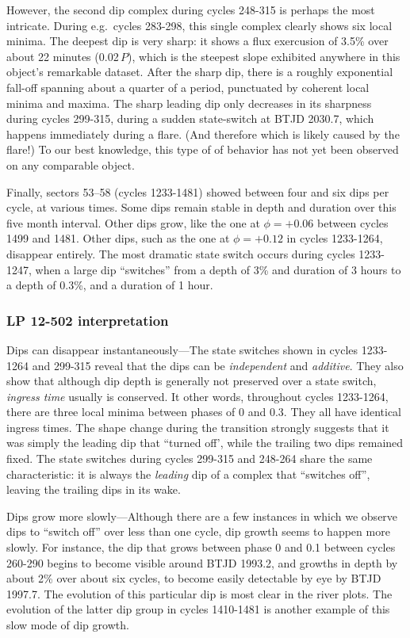 \documentclass[11pt,twocolumn,tighten]{aastex63}
\begin{document}
However, the second dip complex during cycles 248-315 is perhaps the
most intricate.  During e.g.~cycles 283-298, this single complex
clearly shows six local minima.  The deepest dip is very sharp: it
shows a flux exercusion of 3.5\% over about 22 minutes (0.02\,$P$),
which is the steepest slope exhibited anywhere in this object's
remarkable dataset.  After the sharp dip, there is a roughly
exponential fall-off spanning about a quarter of a period, punctuated
by coherent local minima and maxima.  The sharp leading dip only
decreases in its sharpness during cycles 299-315, during a sudden
state-switch at BTJD 2030.7, which happens immediately during a flare.
(And therefore which is likely caused by the flare!) To our best
knowledge, this type of of behavior has not yet been observed on any
comparable object.

Finally, sectors 53--58 (cycles 1233-1481) showed between four and six
dips per cycle, at various times.  Some dips remain stable in depth
and duration over this five month interval.  Other dips grow, like the
one at $\phi = +0.06$ between cycles 1499 and 1481.  Other dips, such
as the one at $\phi = +0.12$ in cycles 1233-1264, disappear entirely.
The most dramatic state switch occurs during cycles 1233-1247, when a
large dip ``switches'' from a depth of 3\% and duration of 3 hours to
a depth of 0.3\%, and a duration of 1 hour.

\subsubsection{LP 12-502 interpretation}

{\sc Dips can disappear instantaneously}---The state switches shown in cycles
1233-1264 and 299-315 reveal that the dips can be {\it independent}
and {\it additive}.  They also show that although dip depth is
generally not preserved over a state switch, {\it ingress time}
usually is conserved.
It other words, throughout cycles 1233-1264, there are three local
minima between phases of 0 and 0.3.  They all have identical ingress
times.  The shape change during the transition strongly suggests that
it was simply the leading dip that ``turned off', while the trailing
two dips remained fixed.  The state switches during cycles 299-315 and
248-264 share the same characteristic: it is always the {\it leading}
dip of a complex that ``switches off'', leaving the trailing dips in
its wake.

{\sc Dips grow more slowly}---Although there are a few instances in
which we observe dips to ``switch off'' over less than one cycle, dip
growth seems to happen more slowly.  For instance, the dip that grows
between phase 0 and 0.1 between cycles 260-290 begins to become
visible around BTJD 1993.2, and growths in depth by about 2\% over
about six cycles, to become easily detectable by eye by BTJD 1997.7.
The evolution of this particular dip is most clear in the river plots.
The evolution of the latter dip group in cycles 1410-1481 is another
example of this slow mode of dip growth.
\end{document}
